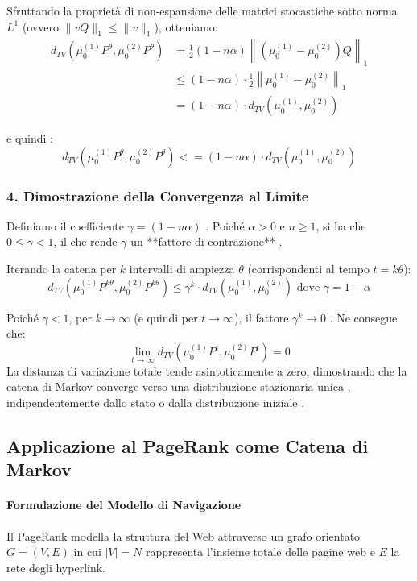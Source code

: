 Sfruttando la proprietà di non-espansione delle matrici stocastiche sotto norma $L^1$ (ovvero $\|v Q\|_1 \le \|v\|_1$), otteniamo:
\begin{align*}
d_{TV}(\mu_0^{(1)} P^\theta, \mu_0^{(2)} P^\theta) &= \frac{1}{2} (1 - n\alpha) \left\| \left( \mu_0^{(1)} - \mu_0^{(2)} \right) Q \right\|_1 \\
&\le (1 - n\alpha) \cdot \frac{1}{2} \left\| \mu_0^{(1)} - \mu_0^{(2)} \right\|_1 \\
&= (1 - n\alpha) \cdot d_{TV}(\mu_0^{(1)}, \mu_0^{(2)})
\end{align*}

e quindi :
\begin{equation}
    d_{TV}(\mu_0^{(1)} P^\theta, \mu_0^{(2)} P^\theta) <= (1 - n\alpha) \cdot d_{TV}(\mu_0^{(1)}, \mu_0^{(2)})
\end{equation}

\subsubsection*{4. Dimostrazione della Convergenza al Limite}
Definiamo il coefficiente $\gamma = (1 - n\alpha)$ . Poiché $\alpha > 0$ e $n \ge 1$, si ha che $0 \le \gamma < 1$, il che rende $\gamma$ un **fattore di contrazione** .

Iterando la catena per $k$ intervalli di ampiezza $\theta$ (corrispondenti al tempo $t = k\theta$):
\begin{equation}
d_{TV}(\mu_0^{(1)} P^{k\theta}, \mu_0^{(2)} P^{k\theta}) \le \gamma^k \cdot d_{TV}(\mu_0^{(1)}, \mu_0^{(2)}) \text{ dove } \gamma = 1-\alpha
\end{equation}

Poiché $\gamma < 1$, per $k \to \infty$ (e quindi per $t \to \infty$), il fattore $\gamma^k \to 0$ . Ne consegue che:
\begin{equation}
\lim_{t \to \infty} d_{TV}(\mu_0^{(1)} P^t, \mu_0^{(2)} P^t) = 0
\end{equation}
La distanza di variazione totale tende asintoticamente a zero, dimostrando che la catena di Markov converge verso una distribuzione stazionaria unica , indipendentemente dallo stato o dalla distribuzione iniziale .
\subsection{Applicazione al PageRank come Catena di Markov}

\paragraph{Formulazione del Modello di Navigazione}
Il PageRank modella la struttura del Web attraverso un grafo orientato $G = (V, E)$ in cui $|V| = N$ rappresenta l'insieme totale delle pagine web e $E$ la rete degli hyperlink.

